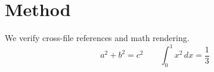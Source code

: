 \section{Method}
We verify cross-file references and math rendering.
\[ a^2 + b^2 = c^2 \qquad \int_0^1 x^2 \, dx = \frac{1}{3} \]
